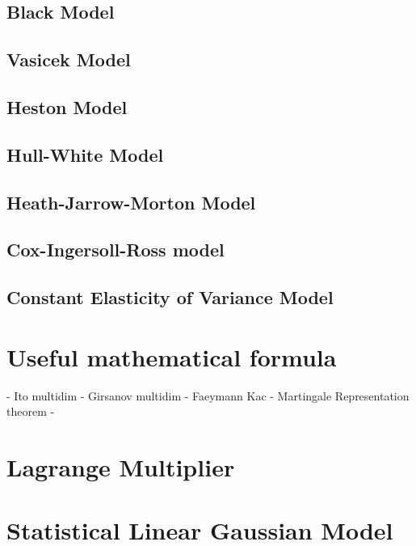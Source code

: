 \documentclass[a4paper,10pt]{article}
\begin{document}
\subsection{Black Model}
\subsection{Vasicek Model}
\subsection{Heston Model}
\subsection{Hull-White Model}
\subsection{Heath-Jarrow-Morton Model}
\subsection{Cox-Ingersoll-Ross model}
\subsection{Constant Elasticity of Variance Model}
\section{Useful mathematical formula}
- Ito multidim
- Girsanov multidim
- Faeymann Kac
- Martingale Representation theorem
- 
\section{Lagrange Multiplier}
\section{Statistical Linear Gaussian Model}
%
%
\end{document}
